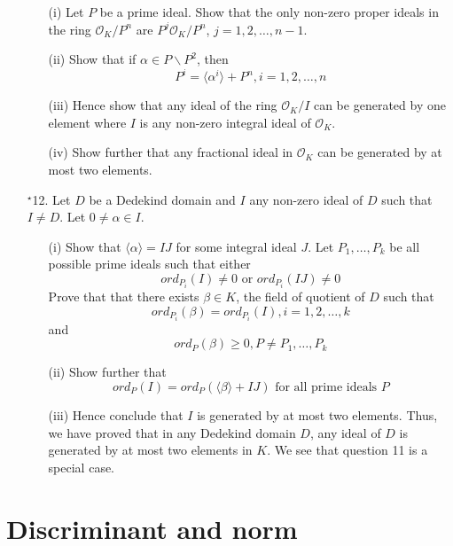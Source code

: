 \begin{enumerate}
\begin{enumerate}
      \item[(i)] Let $P$ be a prime ideal. Show that the only non-zero proper ideals in the ring
      $\mathcal{O}_K/P^n$ are $P^{j}\mathcal{O}_K/P^n$, $j=1,2,\ldots,n-1$.
      \item[(ii)] Show that if $\alpha \in P \backslash P^2$, then
      $$P^i=\langle \alpha^i \rangle +P^n, i=1,2,\ldots,n$$
      \item[(iii)] Hence show that any ideal of the ring $\mathcal{O}_K/I$ can be generated by one element where $I$ is any non-zero integral ideal of $\mathcal{O}_K$.
      \item[(iv)] Show further that any fractional ideal in $\mathcal{O}_K$ can be generated by at most two elements.
      \end{enumerate}
\item[$^\star$12.] Let $D$ be a Dedekind domain and $I$ any non-zero ideal of $D$ such that $I \neq D$. Let $0 \neq \alpha \in I$.
      \begin{enumerate}
      \item[(i)] Show that $\langle \alpha \rangle = IJ$ for some integral ideal $J$. Let $P_1,\ldots,P_k$ be all possible prime ideals such that either
          $$ord_{P_i}(I) \neq 0 \text{ or } ord_{P_i}(IJ) \neq 0$$
      Prove that that there exists $\beta \in K$, the field of quotient of $D$ such that
      $$ord_{P_i}(\beta)=ord_{P_i}(I), i=1,2,\ldots,k$$
      and
      $$ord_P(\beta) \ge 0, P \neq P_1,\ldots,P_k$$
      \item[(ii)] Show further that
      $$ord_P(I)=ord_P(\langle \beta \rangle +IJ) \text{ for all prime ideals } P$$
      \item[(iii)] Hence conclude that $I$ is generated by at most two elements. Thus, we have proved that in any Dedekind domain $D$, any ideal of $D$ is generated by at most two elements in $K$. We see that question 11 is a special case.
      \end{enumerate}
\end{enumerate}

\section{Discriminant and norm}
